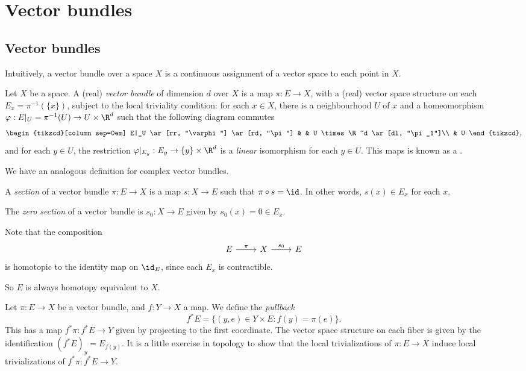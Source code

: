 \documentclass[a4paper]{article}
\begin{document}
\section{Vector bundles}
\subsection{Vector bundles}
Intuitively, a vector bundle over a space $X$ is a continuous assignment of a vector space to each point in $X$.
\begin{defi}
  Let $X$ be a space. A (real) \emph{vector bundle} of dimension $d$ over $X$ is a map $\pi:E \to X$, with a (real) vector space structure on each  $E_x = \pi^{-1}(\{x\})$, subject to the local triviality condition: for each $x \in X$, there is a neighbourhood $U$ of $x$ and a homeomorphism $\varphi:E|_U = \pi^{-1}(U) \to U \times \R^d$ such that the following diagram commutes
  \[
    \begin{tikzcd}[column sep=0em]
      E|_U \ar[rr, "\varphi"] \ar[rd, "\pi"] & & U \times \R^d \ar[dl, "\pi_1"]\\
      & U
    \end{tikzcd},
  \]
  and for each $y \in U$, the restriction $\varphi|_{E_y}: E_y \to \{y\} \times \R^d$ is a \emph{linear} isomorphism for each $y \in U$. This maps is known as a .
\end{defi}
We have an analogous definition for complex vector bundles.

\begin{defi}[Section]
  A \emph{section} of a vector bundle $\pi: E \to X$ is a map $s: X \to E$ such that $\pi \circ s = \id$. In other words, $s(x) \in E_x$ for each $x$.
\end{defi}

\begin{defi}
  The \emph{zero section} of a vector bundle is $s_0: X \to E$ given by $s_0(x) = 0 \in E_x$.
\end{defi}

Note that the composition
\[
  \begin{tikzcd}
    E \ar[r, "\pi"] & X \ar[r, "s_0"] & E
  \end{tikzcd}
\]
is homotopic to the identity map on $\id_E$, since each $E_x$ is contractible.

So $E$ is always homotopy equivalent to $X$.

\begin{defi}
  Let $\pi: E \to X$ be a vector bundle, and $f: Y \to X$ a map. We define the \emph{pullback}
  \[
    f^* E = \{(y, e) \in Y \times E: f(y) = \pi(e)\}.
  \]
  This has a map $f^*\pi: f^*E \to Y$ given by projecting to the first coordinate. The vector space structure on each fiber is given by the identification $(f^*E)_y = E_{f(y)}$. It is a little exercise in topology to show that the local trivializations of $\pi: E \to X$ induce local trivializations of $f^*\pi: f^* E \to Y$.
\end{defi}
\end{document}
